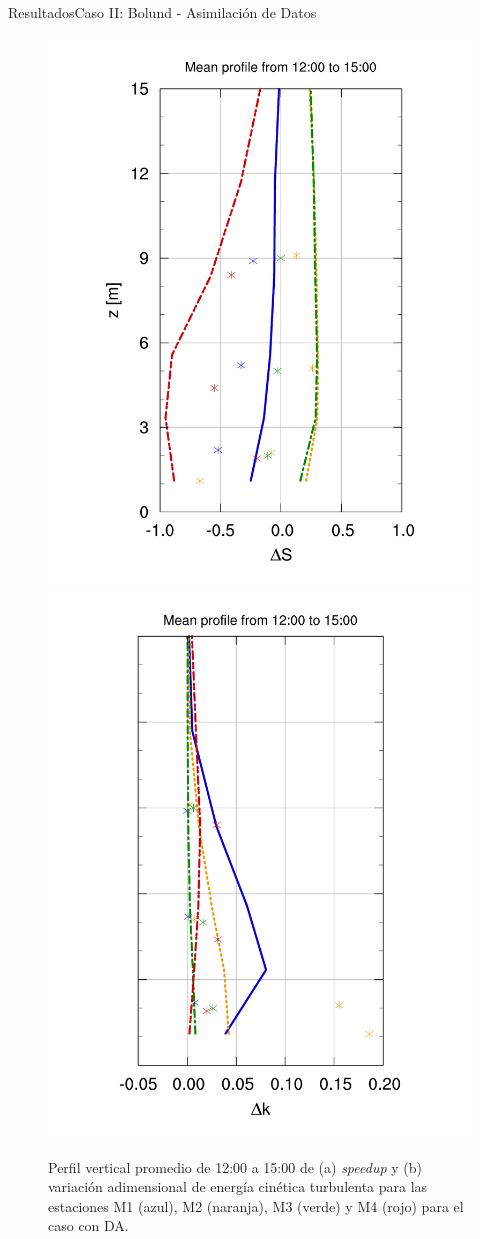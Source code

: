 \documentclass[mathserif,10pt]{beamer}
\begin{document}
\begin{frame}{Resultados}{Caso II: Bolund - Asimilación de Datos}
	\begin{figure}[H]
		\centering
		\includegraphics[height=0.6\linewidth,page=1,trim={28mm 10mm 25mm 23mm},clip]{fig/06/bol_da/V_masts}%
		\includegraphics[height=0.6\linewidth,page=1,trim={30mm 10mm 17mm 20mm},clip]{fig/06/bol_da/k_masts}%
		\vspace{-2mm}\caption{Perfil vertical promedio de 12:00 a 15:00 de (a) \emph{speedup} y (b) variación adimensional de energía cinética turbulenta para las estaciones M1 (azul), M2 (naranja), M3 (verde) y M4 (rojo) para el caso con DA.}
		\label{fig:06_bol_da_mast_tke_speedup}
	\end{figure}
\end{frame}
\end{document}
